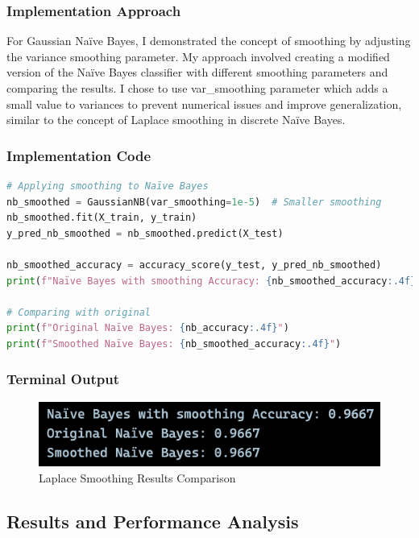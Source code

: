 \documentclass[12pt,a4paper]{article}
\begin{document}
\subsubsection{Implementation Approach}
For Gaussian Na\"{i}ve Bayes, I demonstrated the concept of smoothing by adjusting the variance smoothing parameter. My approach involved creating a modified version of the Na\"{i}ve Bayes classifier with different smoothing parameters and comparing the results. I chose to use var\_smoothing parameter which adds a small value to variances to prevent numerical issues and improve generalization, similar to the concept of Laplace smoothing in discrete Na\"{i}ve Bayes.

\subsubsection{Implementation Code}
\begin{lstlisting}[language=Python, caption=Apply Laplace Smoothing]
# Applying smoothing to Naïve Bayes
nb_smoothed = GaussianNB(var_smoothing=1e-5)  # Smaller smoothing
nb_smoothed.fit(X_train, y_train)
y_pred_nb_smoothed = nb_smoothed.predict(X_test)

nb_smoothed_accuracy = accuracy_score(y_test, y_pred_nb_smoothed)
print(f"Naïve Bayes with smoothing Accuracy: {nb_smoothed_accuracy:.4f}")

# Comparing with original
print(f"Original Naïve Bayes: {nb_accuracy:.4f}")
print(f"Smoothed Naïve Bayes: {nb_smoothed_accuracy:.4f}")
\end{lstlisting}

\subsubsection{Terminal Output}

\begin{figure}[h!]
    \centering
    \includegraphics[width=\textwidth]{Figures/smoothing.png}
    \caption{Laplace Smoothing Results Comparison}
\end{figure}

\subsection{Results and Performance Analysis}
\end{document}
